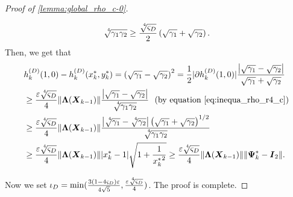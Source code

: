 \documentclass[final,onefignum,onetabnum]{siamart190516}
\newcommand{\matr}[1]{\boldsymbol{#1}}
\newcommand{\Utwo}{\Psi}
\begin{document}
\begin{proof}[Proof of \cref{lemma:global_rho_c-0}]
\begin{itemize}
\begin{equation}
\sqrt[\leftroot{-3}\uproot{5}4]{\gamma_{1}\gamma_{2}}\geq \frac{\sqrt[\leftroot{-2}\uproot{4}4]{\varsigma_{D}}}{2} \left(\sqrt{\gamma_{1}}+\sqrt{\gamma_{2}}\right).
\end{equation}
Then, we get that 
\begin{align*}
&h^{(D)}_{k}(1,0) - h^{(D)}_{k}(x_k^*,y_k^*)
= \left(\sqrt{\gamma_{1}}-\sqrt{\gamma_{2}}\right)^2
=\frac{1}{2}|\partial h^{(D)}_{k}(1,0)|\frac{\left|\sqrt{\gamma_{1}}-\sqrt{\gamma_{2}}\right|}{\sqrt{\gamma_{1}}+\sqrt{\gamma_{2}}}\\
&\geq \frac{\varepsilon\sqrt[\leftroot{-2}\uproot{4}4]{\varsigma_{D}}}{4}\|\matr{\Lambda}(\matr{X}_{k-1})\|\frac{\left|\sqrt{\gamma_{1}}-\sqrt{\gamma_{2}}\right|}{\sqrt[\leftroot{-3}\uproot{5}4]{\gamma_{1}\gamma_{2}}} \ \ (\textrm{by equation \cref{eq:inequa_rho_r4_c}})\\
&\geq\frac{\varepsilon\sqrt[\leftroot{-2}\uproot{4}4]{\varsigma_{D}}}{4}\|\matr{\Lambda}(\matr{X}_{k-1})\|
\frac{\left|\sqrt[\leftroot{-3}\uproot{5}4]{\gamma_{1}}-\sqrt[\leftroot{-3}\uproot{5}4]{\gamma_{2}}\right|\left(\sqrt{\gamma_{1}}+\sqrt{\gamma_{2}}\right)^{1/2}}
{\sqrt[\leftroot{-3}\uproot{5}4]{\gamma_{1}\gamma_{2}}}\\
&\geq\frac{\varepsilon\sqrt[\leftroot{-2}\uproot{4}4]{\varsigma_{D}}}{4}\|\matr{\Lambda}(\matr{X}_{k-1})\||x_k^{*}-1|\sqrt{1+\frac{1}{{x_k^{*}}^2}}
\geq\frac{\varepsilon\sqrt[\leftroot{-2}\uproot{4}4]{\varsigma_{D}}}{4}\|\matr{\Lambda}(\matr{X}_{k-1})\|\|\matr{\Utwo}^{*}_{k}-\matr{I}_{2}\|. 
\end{align*}
\end{itemize}
Now we set $\iota_{D} = \min(\frac{3(1-4\varsigma_{D})\varepsilon}{4\sqrt{5}},\frac{\varepsilon\sqrt[\leftroot{-2}\uproot{4}4]{\varsigma_{D}}}{4})$. 
The proof is complete.
\end{proof}
\end{document}
